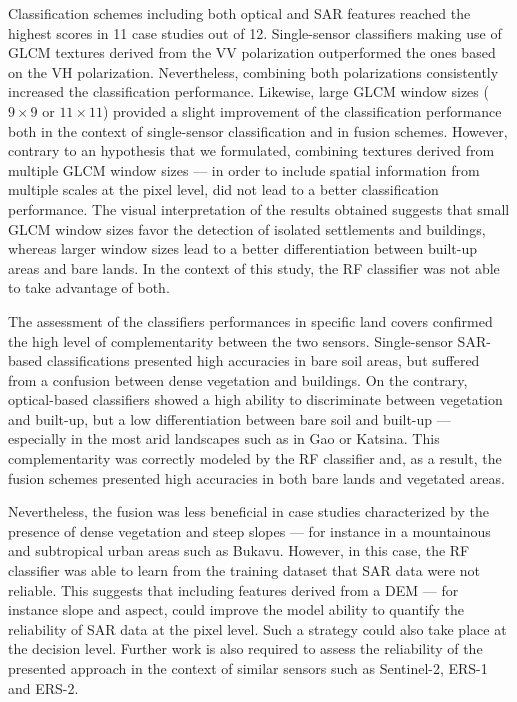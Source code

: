 \documentclass[remotesensing,article,submit,moreauthors,pdftex,10pt,a4paper]{Definitions/mdpi}
\begin{document}
Classification schemes including both optical and SAR features reached the
highest scores in 11 case studies out of 12. Single-sensor classifiers making
use of GLCM textures derived from the VV polarization outperformed the ones
based on the VH polarization. Nevertheless, combining both polarizations
consistently increased the classification performance. Likewise, large GLCM
window sizes (\(9 \times 9\) or \(11 \times 11\)) provided a slight improvement
of the classification performance both in the context of single-sensor
classification and in fusion schemes. However, contrary to an hypothesis that we
formulated, combining textures derived from multiple GLCM window sizes --- in
order to include spatial information from multiple scales at the pixel level,
did not lead to a better classification performance. The visual interpretation
of the results obtained suggests that small GLCM window sizes favor the
detection of isolated settlements and buildings, whereas larger window sizes
lead to a better differentiation between built-up areas and bare lands. In the
context of this study, the RF classifier was not able to take advantage of both.

The assessment of the classifiers performances in specific land covers confirmed
the high level of complementarity between the two sensors. Single-sensor
SAR-based classifications presented high accuracies in bare soil areas, but
suffered from a confusion between dense vegetation and buildings. On the
contrary, optical-based classifiers showed a high ability to discriminate
between vegetation and built-up, but a low differentiation between bare soil and
built-up --- especially in the most arid landscapes such as in Gao or Katsina.
This complementarity was correctly modeled by the RF classifier and, as a
result, the fusion schemes presented high accuracies in both bare lands and
vegetated areas.

Nevertheless, the fusion was less beneficial in case studies characterized by
the presence of dense vegetation and steep slopes --- for instance in a
mountainous and subtropical urban areas such as Bukavu. However, in this case,
the RF classifier was able to learn from the training dataset that SAR data were
not reliable. This suggests that including features derived from a DEM --- for
instance slope and aspect, could improve the model ability to quantify the
reliability of SAR data at the pixel level. Such a strategy could also take
place at the decision level. Further work is also required to assess the
reliability of the presented approach in the context of similar sensors such as
Sentinel-2, ERS-1 and ERS-2.
\end{document}
